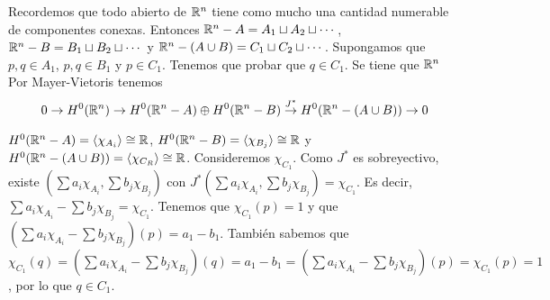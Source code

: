 \documentclass[twoside]{article}
\begin{document}
\begin{solucion}
%
%

Recordemos que todo abierto de $\mathbb{R}^n$ tiene como mucho una cantidad numerable de componentes conexas. Entonces $\mathbb{R}^n-A=A_1\sqcup A_2\sqcup\cdots$, $\mathbb{R}^n-B=B_1\sqcup B_2\sqcup\cdots$  y $\mathbb{R}^n-(A\cup B)=C_1\sqcup C_2\sqcup\cdots$. Supongamos que $p,q\in A_1$, $p,q\in B_1$ y $p\in C_1$. Tenemos que probar que $q\in C_1$. Se tiene que $\mathbb{R}^n$ Por Mayer-Vietoris tenemos
\[
0\to H^0(\mathbb{R}^n)\to H^0(\mathbb{R}^n-A)\oplus H^0(\mathbb{R}^n-B)\overset{J^*}{\to} H^0(\mathbb{R}^n-(A\cup B))\to 0
\]

$H^0(\mathbb{R}^n-A)=\langle \chi_{A_i}\rangle\cong\mathbb{R}$, $H^0(\mathbb{R}^n-B)=\langle \chi_{B_j}\rangle\cong\mathbb{R}$ y $H^0(\mathbb{R}^n-(A\cup B))=\langle \chi_{C_R}\rangle\cong\mathbb{R}$. Consideremos $\chi_{C_1}$. Como $J^*$ es sobreyectivo, existe $(\sum a_i\chi_{A_i},\sum b_j\chi_{B_j})$ con $J^*(\sum a_i\chi_{A_i},\sum b_j\chi_{B_j})=\chi_{C_1}$. Es decir, $\sum a_i\chi_{A_i}-\sum b_j\chi_{B_j}=\chi_{C_1}$. Tenemos que $\chi_{C_1}(p)=1$ y que  $(\sum a_i\chi_{A_i}-\sum b_j\chi_{B_j})(p)=a_1-b_1$. También sabemos que $\chi_{C_1}(q)=(\sum a_i\chi_{A_i}-\sum b_j\chi_{B_j})(q)=a_1-b_1=(\sum a_i\chi_{A_i}-\sum b_j\chi_{B_j})(p)=\chi_{C_1}(p)=1$, por lo que $q\in C_1$. 
\end{solucion}
\end{document}
